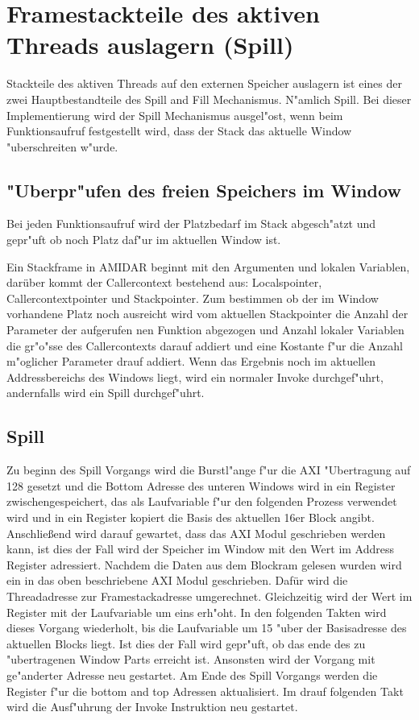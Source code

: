 \section{Framestackteile des aktiven Threads auslagern (Spill)}

Stackteile des aktiven Threads auf den externen Speicher auslagern ist eines der zwei Hauptbestandteile des Spill and Fill Mechanismus. N"amlich Spill. Bei dieser Implementierung wird der Spill Mechanismus ausgel"ost, wenn beim Funktionsaufruf festgestellt wird, dass der Stack das aktuelle Window "uberschreiten w"urde.

\subsection{"Uberpr"ufen des freien Speichers im Window}
Bei jeden Funktionsaufruf wird der Platzbedarf im Stack abgesch"atzt und gepr"uft ob noch Platz daf"ur im aktuellen Window ist. 

Ein Stackframe in AMIDAR beginnt mit den Argumenten und lokalen Variablen, darüber kommt der Callercontext bestehend aus: Localspointer, Callercontextpointer und Stackpointer. Zum bestimmen ob der im Window vorhandene Platz noch ausreicht wird vom aktuellen Stackpointer die Anzahl der Parameter der aufgerufen nen Funktion abgezogen und Anzahl lokaler Variablen die gr"o{"ss}e des Callercontexts darauf addiert und eine Kostante f"ur die Anzahl m"oglicher Parameter drauf addiert. Wenn das Ergebnis noch im aktuellen Addressbereichs des Windows liegt, wird ein normaler Invoke durchgef"uhrt, andernfalls wird ein Spill durchgef"uhrt. 


\subsection{Spill}
Zu beginn des Spill Vorgangs wird die Burstl"ange f"ur die AXI "Ubertragung auf 128 gesetzt und die Bottom Adresse des unteren Windows wird in ein Register zwischengespeichert, das als Laufvariable f"ur den folgenden Prozess verwendet wird und in ein Register kopiert die Basis des aktuellen 16er Block angibt. 
Anschlie{\ss}end wird darauf gewartet, dass das AXI Modul geschrieben werden kann, ist dies der Fall wird der Speicher im Window mit den Wert im Address Register adressiert. 
Nachdem die Daten aus dem Blockram gelesen wurden wird ein in das oben beschriebene AXI Modul geschrieben. Dafür wird die Threadadresse zur Framestackadresse umgerechnet. Gleichzeitig wird der Wert im Register mit der Laufvariable um eins erh"oht.  In den folgenden Takten wird dieses Vorgang wiederholt, bis die Laufvariable um 15 "uber der Basisadresse des aktuellen Blocks liegt. Ist dies der Fall wird gepr"uft, ob das ende des zu "ubertragenen Window Parts erreicht ist. Ansonsten wird der Vorgang mit ge"anderter Adresse neu gestartet. 
Am Ende des Spill Vorgangs werden die Register f"ur die bottom and top Adressen aktualisiert. Im drauf folgenden Takt wird die Ausf"uhrung der Invoke Instruktion neu gestartet.


